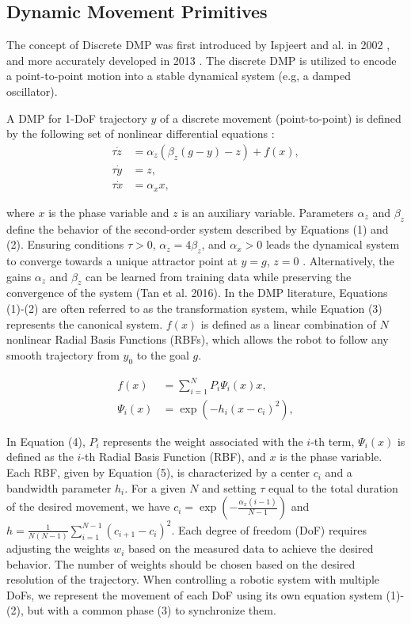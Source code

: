 \documentclass[conference]{IEEEtran}
\begin{document}
\subsection{Dynamic Movement Primitives}

The concept of Discrete DMP was first introduced by Ispjeert and al. in 2002 \cite{ijspeert_movement_2002}, and more accurately developed in 2013 \cite{ijspeert_dynamical_2013}. The discrete DMP is utilized to encode a point-to-point motion into a stable dynamical system (e.g, a damped oscillator).

 A DMP for 1-DoF trajectory $y$ of a discrete movement (point-to-point) is defined by the following set of nonlinear differential equations \cite{ijspeert_movement_2002}:
\begin{align}
\tau \dot{z} &= \alpha_z \left(\beta_z(g - y) - z\right) + f(x),  \\
\tau \dot{y} &= z, \\
\tau \dot{x} &= \alpha_x x, 
\end{align}

where $x$ is the phase variable and $z$ is an auxiliary variable. Parameters $\alpha_z$ and $\beta_z$ define the behavior of the second-order system described by Equations (1) and (2). Ensuring conditions $\tau > 0$, $\alpha_z = 4\beta_z$, and $\alpha_x > 0$ leads the dynamical system  to converge towards a unique attractor point at $y=g$, $z=0$ \cite{ijspeert_dynamical_2013}. Alternatively, the gains $\alpha_z$ and $\beta_z$ can be learned from training data while preserving the convergence of the system (Tan et al. 2016). In the DMP literature, Equations (1)-(2) are often referred to as the transformation system, while Equation (3) represents the canonical system. $f(x)$ is defined as a linear combination of $N$ nonlinear Radial Basis Functions (RBFs), which allows the robot to follow any smooth trajectory from  $y_0$ to the goal $g$.

\begin{align}
f(x) &= \sum_{i=1}^{N} P_i \Psi_i(x) x,  \\
\Psi_i(x) &= \exp \left(-h_i (x - c_i)^2\right),  
\end{align}

In Equation (4),  $P_i$ represents the weight associated with the $i$-th term, $\Psi_i(x)$ is defined as the $i$-th Radial Basis Function (RBF), and $x$ is the phase variable. Each RBF, given by Equation (5), is characterized by a center $c_i$ and a bandwidth parameter $h_i$.
For a given $N$ and setting $\tau$ equal to the total duration of the desired movement, we have $c_i = \exp\left(-\frac{\alpha_x(i-1)}{N-1}\right)$ and $h = \frac{1}{N(N-1)}\sum_{i=1}^{N-1}(c_{i+1}-c_i)^2$. Each degree of freedom (DoF) requires adjusting the weights $w_i$ based on the measured data to achieve the desired behavior. The number of weights should be chosen based on the desired resolution of the trajectory. When controlling a robotic system with multiple DoFs, we represent the movement of each DoF using its own equation system (1)-(2), but with a common phase (3) to synchronize them.
\end{document}
